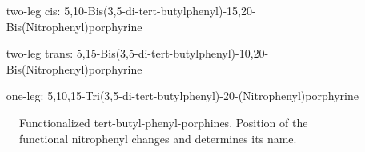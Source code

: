 \begin{itemize}
\item[two-leg cis:] 	5,10-Bis(3,5-di-tert-butylphenyl)-15,20-Bis(Nitrophenyl)porphyrine
\item[two-leg trans:] 	5,15-Bis(3,5-di-tert-butylphenyl)-10,20-Bis(Nitrophenyl)porphyrine
\item[one-leg:] 	5,10,15-Tri(3,5-di-tert-butylphenyl)-20-(Nitrophenyl)porphyrine
\end{itemize}

\begin{figure}[ht]
 \begin{center}
 \end{center}
\caption{Functionalized tert-butyl-phenyl-porphines. Position of the functional nitrophenyl changes and determines its name.}
\label{fig:nitro-trans-cis}
\end{figure}

